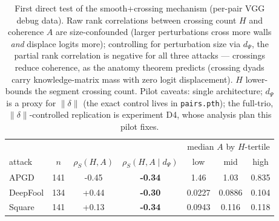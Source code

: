 \begin{table}[t]
\centering\small
\begin{tabular}{lcccccc}
\toprule
 & & & & \multicolumn{3}{c}{median $A$ by $H$-tertile} \\
attack & $n$ & $\rho_S(H,A)$ & $\rho_S(H,A \mid d_\Psi)$ & low & mid & high \\
\midrule
APGD & 141 & -0.45 & \textbf{-0.34} & 1.46 & 1.03 & 0.835 \\
DeepFool & 134 & +0.44 & \textbf{-0.30} & 0.0227 & 0.0886 & 0.104 \\
Square & 141 & +0.13 & \textbf{-0.34} & 0.0943 & 0.116 & 0.118 \\
\bottomrule
\end{tabular}
\caption{First direct test of the smooth+crossing mechanism (per-pair VGG debug data).
Raw rank correlations between crossing count $H$ and coherence $A$ are size-confounded
(larger perturbations cross more walls \emph{and} displace logits more); controlling for
perturbation size via $d_\Psi$, the partial rank correlation is negative for all three attacks
--- crossings reduce coherence, as the anatomy theorem predicts (crossing dyads carry
knowledge-matrix mass with zero logit displacement). $H$ lower-bounds the segment crossing
count. Pilot caveats: single architecture; $d_\Psi$ is a proxy for $\|\delta\|$ (the exact
control lives in \texttt{pairs.pth}); the full-trio, $\|\delta\|$-controlled replication is
experiment D4, whose analysis plan this pilot fixes.}
\label{tab:mechanism-pilot}
\end{table}
